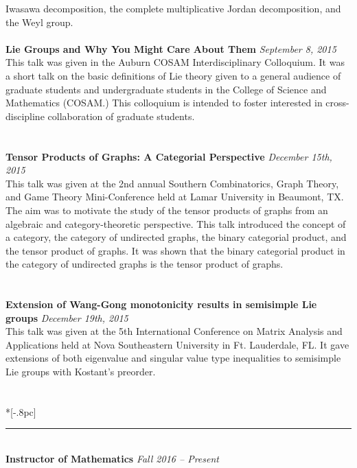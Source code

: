 \documentclass{article}
\begin{document}
Iwasawa decomposition, the complete multiplicative Jordan decomposition, and the
Weyl group.
\\ \\
\textbf{Lie Groups and Why You Might Care About Them} \hfill \textit{September
  8, 2015} \\
This talk was given in the Auburn COSAM Interdisciplinary Colloquium. It was a
short talk on the basic definitions of Lie theory given to a general audience of
graduate students and undergraduate students in the College of Science and
Mathematics (COSAM.) This colloquium is intended to foster interested in
cross-discipline collaboration of graduate students.\\
\\ \\
\textbf{Tensor Products of Graphs: A Categorial Perspective} \hfill
\textit{December 15th, 2015} \\
This talk was given at the 2nd annual Southern Combinatorics, Graph Theory, and
Game Theory Mini-Conference held at Lamar University in Beaumont, TX. The aim
was to motivate the study of the tensor products of graphs from an algebraic and
category-theoretic perspective. This talk introduced the concept of a category,
the category of undirected graphs, the binary categorial product, and the tensor
product of graphs. It was shown that the binary categorial product in the
category of undirected graphs is the
tensor product of graphs. \\
\\ \\
\textbf{Extension of Wang-Gong monotonicity results in semisimple Lie groups}
\hfill \textit{December 19th, 2015} \\
This talk was given at the 5th International Conference on Matrix Analysis and
Applications held at Nova Southeastern University in Ft. Lauderdale, FL. It gave
extensions of both eigenvalue and singular value type inequalities to semisimple
Lie groups with Kostant's preorder. \\
\\
 \\*[-.8pc]
\rule{\textwidth}{.1pt} \\
\textbf{Instructor of Mathematics} \hfill \textit{Fall 2016 -- Present} \\
\end{document}
